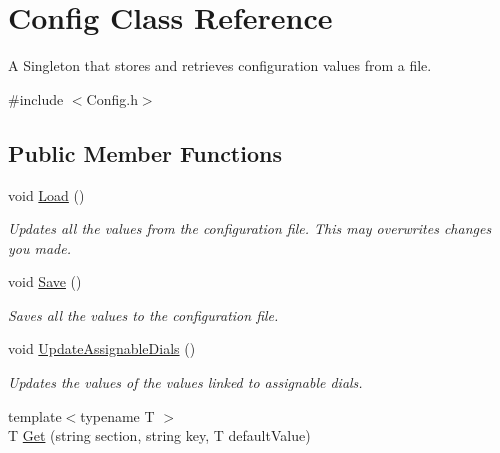 \hypertarget{class_config}{\section{\-Config \-Class \-Reference}
\label{class_config}
}


\-A \-Singleton that stores and retrieves configuration values from a file.  




{\ttfamily \#include $<$\-Config.\-h$>$}

\subsection*{\-Public \-Member \-Functions}
\begin{DoxyCompactItemize}
\item 
\hypertarget{class_config_a99b19da81af9603ca95103b375d5bd90}{void \hyperlink{class_config_a99b19da81af9603ca95103b375d5bd90}{\-Load} ()}\label{class_config_a99b19da81af9603ca95103b375d5bd90}

\begin{DoxyCompactList}\small\item\em \-Updates all the values from the configuration file. \-This may overwrites changes you made. \end{DoxyCompactList}\item 
\hypertarget{class_config_ab04c51d227c1457404ae9dadc1c576e1}{void \hyperlink{class_config_ab04c51d227c1457404ae9dadc1c576e1}{\-Save} ()}\label{class_config_ab04c51d227c1457404ae9dadc1c576e1}

\begin{DoxyCompactList}\small\item\em \-Saves all the values to the configuration file. \end{DoxyCompactList}\item 
\hypertarget{class_config_a2064e621e224d1f6053ef7fabe4d4045}{void \hyperlink{class_config_a2064e621e224d1f6053ef7fabe4d4045}{\-Update\-Assignable\-Dials} ()}\label{class_config_a2064e621e224d1f6053ef7fabe4d4045}

\begin{DoxyCompactList}\small\item\em \-Updates the values of the values linked to assignable dials. \end{DoxyCompactList}\item 
\hypertarget{class_config_ae2af4140fa3482e07978c8f8f023b42d}{{\footnotesize template$<$typename T $>$ }\\\-T \hyperlink{class_config_ae2af4140fa3482e07978c8f8f023b42d}{\-Get} (string section, string key, \-T default\-Value)}\label{class_config_ae2af4140fa3482e07978c8f8f023b42d}


\end{DoxyCompactItemize}
